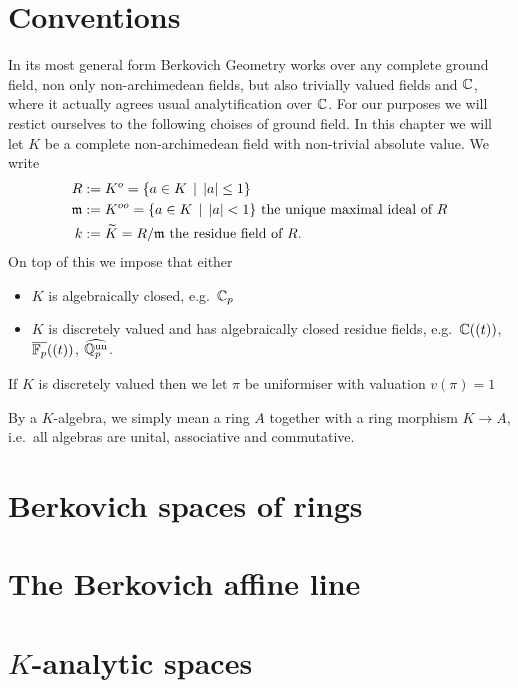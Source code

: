 \section{Conventions} \label{sec:introduction}
In its most general form Berkovich Geometry works over any complete ground field, non only non-archimedean fields, but also trivially valued fields and $\mathbb{C}$, where it actually agrees usual analytification over $\mathbb{C}$. 
For our purposes we will restict ourselves to the following choises of ground field. 
In this chapter we will let $K$ be a complete non-archimedean field with non-trivial absolute value. We write 
\begin{align*}
	R &:= K^{o} = \{a \in K \st |a| \le 1\} \\
	\mathfrak{m}  &:= K^{oo} =  \{a \in K \st |a| < 1\}  \text{ the unique maximal ideal of } R\\
	k &:= \widetilde K = R / \mathfrak{m} \text{ the residue field of } R
.\end{align*}
On top of this we impose that either 
\begin{itemize}
	\item $K$ is algebraically closed, e.g.\ $\mathbb{C}_p$
	\item $K$ is discretely valued and has algebraically closed residue fields, 
		e.g.\ $\mathbb{C}((t))$, $\overline{\mathbb{F}_p}((t))$, $\widehat{\mathbb{Q}_{p}^{\text{un}}}$. 
\end{itemize}
If $K$ is discretely valued then we let $\pi$ be uniformiser with valuation $v(\pi) = 1$

By a $K$-algebra, we simply mean a ring $A$ together with a ring morphism $K \to A$, i.e.\ all algebras are unital, associative and commutative.  

\section{Berkovich spaces of rings} \label{sec:berkovich_spaces}


\section{The Berkovich affine line} \label{sec:the_berkovich_affine_line}



\section{$K$-analytic spaces} \label{sec:K_analytic_spaces}




